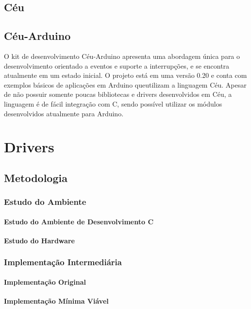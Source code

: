 \documentclass{article}
\begin{document}
\subsection{Céu}
\subsection{Céu-Arduino}

\par O kit de desenvolvimento Céu-Arduino apresenta uma abordagem única para o desenvolvimento
orientado a eventos e suporte a interrupções, e se encontra atualmente em um estado inicial. O
projeto está em uma versão 0.20 e conta com exemplos básicos de aplicações em Arduino queutilizam a linguagem Céu. Apesar de não possuir somente poucas bibliotecas e drivers desenvolvidos
em Céu, a linguagem é de fácil integração com C, sendo possível utilizar os módulos desenvolvidos
atualmente para Arduino. \cite{githubceuarduino}

\section{Drivers}

\subsection{Metodologia}
\subsubsection{Estudo do Ambiente}
\paragraph{Estudo do Ambiente de Desenvolvimento C}
\paragraph{Estudo do Hardware}
\subsubsection{Implementação Intermediária}
\paragraph{Implementação Original}
\paragraph{Implementação Mínima Viável}
\end{document}
